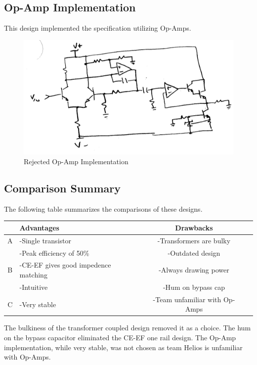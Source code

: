 \documentclass[journal]{IEEEtran}
\begin{document}
\subsection{Op-Amp Implementation}

This design implemented the specification utilizing Op-Amps.

\begin{figure}[H]
\centering
\includegraphics[scale=.4]{reject-3.png}
\caption{Rejected Op-Amp Implementation}
\label{fig_reject_3}
\end{figure}

\subsection{Comparison Summary}

The following table summarizes the comparisons of these designs. 

\begin{tabular}{|c|p{3cm}|c|c|}
\hline
& Advantages & Drawbacks \\
\hline
A & -Single transistor & -Transformers are bulky\\
  & -Peak efficiency of 50\% & -Outdated design\\
\hline
B& -CE-EF gives good impedence matching & -Always drawing power \\
 & -Intuitive & -Hum on bypass cap\\
\hline
C & -Very stable & -Team unfamiliar with Op-Amps\\
\hline
\end{tabular}

The bulkiness of the transformer coupled design removed it as a choice. The hum on the bypass capacitor eliminated the CE-EF one rail design. The Op-Amp implementation, while very stable, was not chosen as team Helios is unfamiliar with Op-Amps.
\end{document}

